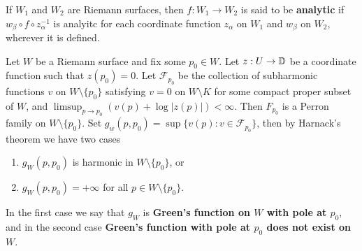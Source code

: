 \documentclass[12pt]{article}
\begin{document}
\begin{definition}
    If $W_1$ and $W_2$ are Riemann surfaces, then $f:W_1\to W_2$ is said to be \textbf{analytic} if $w_\beta\circ f\circ z_\alpha^{-1}$ is analyitc for each coordinate function $z_\alpha$ on $W_1$ and $w_\beta$ on $W_2$, wherever it is defined.
\end{definition}

\begin{definition}
    Let $W$ be a Riemann surface and fix some $p_0\in W$. Let $z:U\to \mathbb{D}$ be a coordinate function such that $z(p_0)=0$. Let $\mathcal{F}_{p_0}$ be the collection of subharmonic functions $v$ on $W\setminus\{p_0\}$ satisfying $v=0$ on $W\setminus K$ for some compact proper subset of $W$, and $\limsup_{p\to p_0} (v(p)+\log|z(p)|)<\infty$. Then $F_{p_0}$ is a Perron family on $W\setminus\{p_0\}$. Set $g_w(p,p_0)=\sup\{v(p):v\in\mathcal{F}_{p_0}\}$, then by Harnack's theorem we have two cases
    \begin{enumerate}[label=(\roman*)]
        \item $g_W(p,p_0)$ is harmonic in $W\setminus\{p_0\}$, or
        \item $g_W(p,p_0)=+\infty$ for all $p\in W\setminus\{p_0\}$.
    \end{enumerate}
    In the first case we say that $g_W$ is \textbf{Green's function on $W$ with pole at $p_0$}, and in the second case \textbf{Green's function with pole at $p_0$ does not exist on $W$}.
\end{definition}
\end{document}

